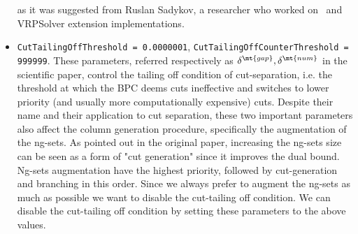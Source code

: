 \begin{itemize}
	      as it was suggested from Ruslan Sadykov,
	      a researcher who worked on \bapcod\ and VRPSolver extension implementations.
	\item \texttt{CutTailingOffThreshold = 0.0000001}, \texttt{CutTailingOffCounterThreshold = 999999}.
	      These parameters, referred respectively as $\delta^\mt{gap}, \delta^\mt{num}$ in the scientific paper,
	      control the tailing off condition of cut-separation, i.e. the threshold
	      at which the BPC deems cuts ineffective and switches to lower priority
	      (and usually more computationally expensive) cuts.
	      Despite their name and their application to cut separation, these two important
	      parameters also affect the column generation procedure, specifically the augmentation of the ng-sets.
	      As pointed out in the original paper,
	      increasing the ng-sets size can be seen as a form of "cut generation"
	      since it improves the dual bound.
	      Ng-sets augmentation have the highest priority, followed by cut-generation and branching in this order.
	      Since we always prefer to augment the ng-sets as much as possible we want
	      to disable the cut-tailing off condition.
	      We can disable the cut-tailing off condition by setting these parameters to the above values.
\end{itemize}

\begin{comment}
[ About what is reduced cost fixing ]
[ Bucket arc elimination procedure = Reduced cost fixing procedure]
\textcite{sadykov2021}
VRPSolver extension includes an implementation of the pricing functor which
allows the user to define the subproblems as resource constrained shortest path
problems in graphs. The functor implements the bucket-graph based labeling
algorithm from paper [16] for solving the pricing problem, as well as the corre-
sponding bucket arc elimination procedure (i.e. reduced cost fixing procedure),
and the elementary route enumeration procedure [1]. VRPSolver extension also
implements cut separation functors for rounded cap
\end{comment}
